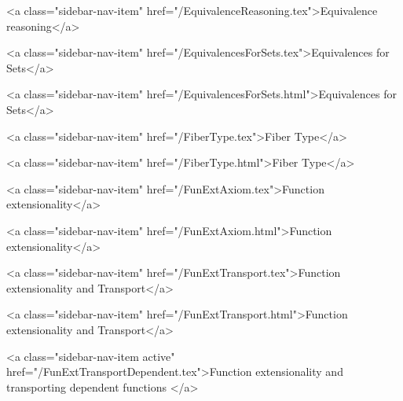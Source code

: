       
    
      
        
          <a class="sidebar-nav-item" href="/EquivalenceReasoning.tex">Equivalence reasoning</a>
        
      
    
      
        
          <a class="sidebar-nav-item" href="/EquivalencesForSets.tex">Equivalences for Sets</a>
        
      
    
      
        
          <a class="sidebar-nav-item" href="/EquivalencesForSets.html">Equivalences for Sets</a>
        
      
    
      
        
          <a class="sidebar-nav-item" href="/FiberType.tex">Fiber Type</a>
        
      
    
      
        
          <a class="sidebar-nav-item" href="/FiberType.html">Fiber Type</a>
        
      
    
      
        
          <a class="sidebar-nav-item" href="/FunExtAxiom.tex">Function extensionality</a>
        
      
    
      
        
          <a class="sidebar-nav-item" href="/FunExtAxiom.html">Function extensionality</a>
        
      
    
      
        
          <a class="sidebar-nav-item" href="/FunExtTransport.tex">Function extensionality and Transport</a>
        
      
    
      
        
          <a class="sidebar-nav-item" href="/FunExtTransport.html">Function extensionality and Transport</a>
        
      
    
      
        
          <a class="sidebar-nav-item active" href="/FunExtTransportDependent.tex">Function extensionality and transporting dependent functions </a>
        
      
    
